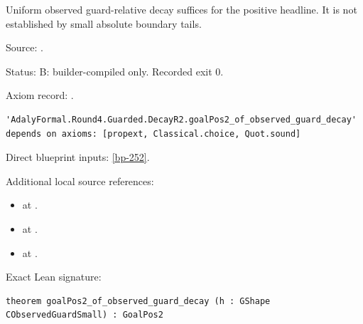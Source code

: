 \begin{theorem}[bp-046]
\label{bp-046}
\leanok
Uniform observed guard-relative decay suffices for the positive headline. It is not established by small absolute boundary tails.

\par Source: \texttt{}.
\par Status: B: builder-compiled only. Recorded exit 0.
\par Axiom record: \texttt{}.
\begin{verbatim}
'AdalyFormal.Round4.Guarded.DecayR2.goalPos2_of_observed_guard_decay' depends on axioms: [propext, Classical.choice, Quot.sound]
\end{verbatim}
\par Direct blueprint inputs: \ref{bp-252}.
\par Additional local source references:
\begin{itemize}
\item \texttt{} at \texttt{}.
\item \texttt{} at \texttt{}.
\item \texttt{} at \texttt{}.
\end{itemize}
\par Exact Lean signature:
\begin{verbatim}
theorem goalPos2_of_observed_guard_decay (h : GShape CObservedGuardSmall) : GoalPos2
\end{verbatim}
\end{theorem}

